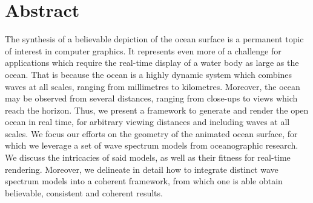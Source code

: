 \chapter*{Abstract}


The synthesis of a believable depiction of the ocean surface is a permanent
topic of interest in computer graphics. It represents even more of a
challenge for applications which require the real-time display of a water
body as large as the ocean.
That is because the ocean is a highly dynamic system which combines waves
at all scales, ranging from millimetres to kilometres. Moreover, the
ocean may be observed from several distances, ranging from close-ups
to views which reach the horizon. 
Thus, we present a framework to generate and render the open ocean in
real time, for arbitrary viewing distances and including waves at all
scales. We focus our efforts on the geometry of the animated
ocean surface, for which we leverage a set of wave spectrum models from
oceanographic research. We discuss the intricacies of
said models, as well as their fitness for real-time rendering. Moreover,
we delineate in detail how to integrate distinct wave spectrum models into a
coherent framework, from which one is able obtain believable, consistent
and coherent results.


